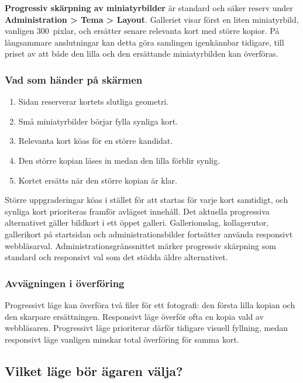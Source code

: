 \documentclass[11pt,a4paper]{article}
\newcommand{\ui}[1]{\textbf{#1}}
\begin{document}
\ui{Progressiv skärpning av miniatyrbilder} är standard och säker reserv under
\ui{Administration > Tema > Layout}. Galleriet visar först en liten
miniatyrbild, vanligen 300~pixlar, och ersätter senare relevanta kort med större
kopior. På långsammare anslutningar kan detta göra samlingen igenkännbar
tidigare, till priset av att både den lilla och den ersättande miniatyrbilden
kan överföras.

\subsubsection{Vad som händer på skärmen}

\begin{enumerate}
  \item Sidan reserverar kortets slutliga geometri.
  \item Små miniatyrbilder börjar fylla synliga kort.
  \item Relevanta kort köas för en större kandidat.
  \item Den större kopian läses in medan den lilla förblir synlig.
  \item Kortet ersätts när den större kopian är klar.
\end{enumerate}

Större uppgraderingar köas i stället för att startas för varje kort samtidigt,
och synliga kort prioriteras framför avlägset innehåll. Det aktuella progressiva
alternativet gäller bildkort i ett öppet galleri. Galleriomslag, kollagerutor,
gallerikort på startsidan och administrationsbilder fortsätter använda
responsivt webbläsarval. Administrationsgränssnittet märker progressiv skärpning
som standard och responsivt val som det stödda äldre alternativet.

\subsubsection{Avvägningen i överföring}

Progressivt läge kan överföra två filer för ett fotografi: den första lilla
kopian och den skarpare ersättningen. Responsivt läge överför ofta en kopia vald
av webbläsaren. Progressivt läge prioriterar därför tidigare visuell fyllning,
medan responsivt läge vanligen minskar total överföring för samma kort.

\subsection{Vilket läge bör ägaren välja?}
\end{document}
